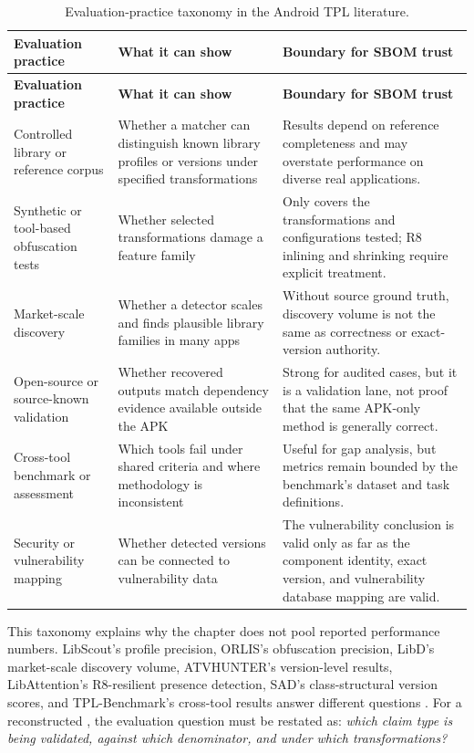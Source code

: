 \begingroup
\small
\renewcommand{\arraystretch}{1.15}
\begin{longtable}{p{}p{}p{}}
\caption{Evaluation-practice taxonomy in the Android TPL literature.}
\label{tab:master-evaluation-taxonomy}\\
\toprule
\textbf{Evaluation practice} & \textbf{What it can show} & \textbf{Boundary for SBOM trust}\\
\midrule
\endfirsthead
\toprule
\textbf{Evaluation practice} & \textbf{What it can show} & \textbf{Boundary for SBOM trust}\\
\midrule
\endhead
\bottomrule
\endfoot
Controlled library or reference corpus &
Whether a matcher can distinguish known library profiles or versions under
specified transformations &
Results depend on reference completeness and may overstate performance on
diverse real applications.\\

Synthetic or tool-based obfuscation tests &
Whether selected transformations damage a feature family &
Only covers the transformations and configurations tested; R8 inlining and
shrinking require explicit treatment.\\

Market-scale discovery &
Whether a detector scales and finds plausible library families in many apps &
Without source ground truth, discovery volume is not the same as correctness
or exact-version authority.\\

Open-source or source-known validation &
Whether recovered outputs match dependency evidence available outside the APK &
Strong for audited cases, but it is a validation lane, not proof that the
same APK-only method is generally correct.\\

Cross-tool benchmark or assessment &
Which tools fail under shared criteria and where methodology is inconsistent &
Useful for gap analysis, but metrics remain bounded by the benchmark's
dataset and task definitions.\\

Security or vulnerability mapping &
Whether detected versions can be connected to vulnerability data &
The vulnerability conclusion is valid only as far as the component identity,
exact version, and vulnerability database mapping are valid.\\
\end{longtable}
\endgroup

This taxonomy explains why the chapter does not pool reported performance
numbers. LibScout's profile precision, ORLIS's obfuscation precision, LibD's
market-scale discovery volume, ATVHUNTER's version-level results,
LibAttention's R8-resilient presence detection, SAD's class-structural
version scores, and TPL-Benchmark's cross-tool results answer different
questions
\cite{backes2016libscout,li2017libd,wang2018orlis,zhan2021atvhunter,pan2025libattention,zhou2025sad,gu2025tplbenchmark}.
For a reconstructed \SBOM, the evaluation question must be restated as:
\emph{which claim type is being validated, against which denominator, and
under which transformations?}

